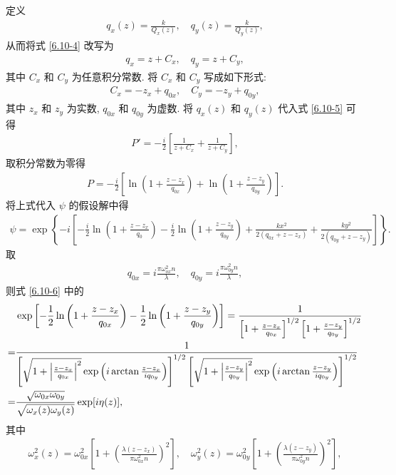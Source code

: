 \documentclass[twoside]{note}
\begin{document}
\begin{pf}
    定义
    \begin{align}
        q_x(z)=\frac{k}{Q_x(z)},\quad q_y(z)=\frac{k}{Q_y(z)},
    \end{align}
    从而将式 \eqref{6.10-4} 改写为
    \begin{align}
        q_x=z+C_x,\quad q_y=z+C_y,
    \end{align}
    其中 $C_x$ 和 $C_y$ 为任意积分常数.
    将 $C_x$ 和 $C_y$ 写成如下形式:
    \begin{align}
        C_x=-z_x+q_{0x},\quad C_y=-z_y+q_{0y},
    \end{align}
    其中 $z_x$ 和 $z_y$ 为实数, $q_{0x}$ 和 $q_{0y}$ 为虚数.
    将 $q_x(z)$ 和 $q_y(z)$ 代入式 \eqref{6.10-5} 可得
    \begin{align}
        P'=-\frac{i}{2}\left[\frac{1}{z+C_x}+\frac{1}{z+C_y}\right],
    \end{align}
    取积分常数为零得
    \begin{align}
        P=-\frac{i}{2}\left[\ln\left(1+\frac{z-z_x}{q_{0x}}\right)+\ln\left(1+\frac{z-z_y}{q_{0y}}\right)\right].
    \end{align}
    将上式代入 $\psi$ 的假设解中得
    \begin{align}
        \label{6.10-6}
        \psi=\exp\left\{-i\left[-\frac{i}{2}\ln\left(1+\frac{z-z_x}{q_0}\right)-\frac{i}{2}\ln\left(1+\frac{z-z_y}{q_{0y}}\right)+\frac{kx^2}{2(q_{0x}+z-z_x)}+\frac{ky^2}{2(q_{0y}+z-z_y)}\right]\right\}.
    \end{align}
    取
    \begin{gather}
        q_{0x}=i\frac{\pi\omega_{ox}^2n}{\lambda},\quad q_{0y}=i\frac{\pi\omega_{0y}^2n}{\lambda},
    \end{gather}
    则式 \eqref{6.10-6} 中的
    \begin{align}
        \notag&\exp\left[-\frac{1}{2}\ln\left(1+\frac{z-z_x}{q_{0x}}\right)-\frac{1}{2}\ln\left(1+\frac{z-z_y}{q_{0y}}\right)\right]=\frac{1}{\left[1+\frac{z-z_x}{q_{0x}}\right]^{1/2}\left[1+\frac{z-z_y}{q_{0y}}\right]^{1/2}}\\
        \notag=&\frac{1}{\left[\sqrt{1+\left\lvert\frac{z-z_x}{q_{0x}}\right\rvert^2}\exp\left(i\arctan\frac{z-z_x}{iq_{0y}}\right)\right]^{1/2}\left[\sqrt{1+\left\lvert\frac{z-z_y}{q_{0y}}\right\rvert^2}\exp\left(i\arctan\frac{z-z_y}{iq_{0y}}\right)\right]^{1/2}}\\
        =&\frac{\sqrt{\omega_{0x}\omega_{0y}}}{\sqrt{\omega_x(z)\omega_y(z)}}\exp[i\eta(z)],
    \end{align}
    其中
    \begin{gather}
        \omega_x^2(z)=\omega_{0x}^2\left[1+\left(\frac{\lambda(z-z_x)}{\pi\omega_{0x}^2n}\right)^2\right],\quad\omega_y^2(z)=\omega_{0y}^2\left[1+\left(\frac{\lambda(z-z_y)}{\pi\omega_{0y}^2n}\right)^2\right],\\

\end{gather}
\end{pf}
\end{document}
